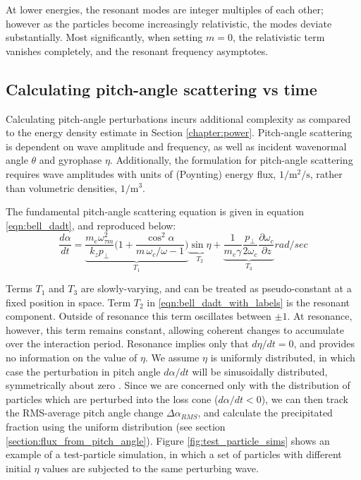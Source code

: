 At lower energies, the resonant modes are integer multiples of each other; however as the particles become increasingly relativistic, the modes deviate substantially. Most significantly, when setting $m=0$, the relativistic term vanishes completely, and the resonant frequency asymptotes.

\subsection{Calculating pitch-angle scattering vs time}

Calculating pitch-angle perturbations incurs additional complexity as compared to the energy density estimate in Section \ref{chapter:power}. Pitch-angle scattering is dependent on wave amplitude and frequency, as well as incident wavenormal angle $\theta$ and gyrophase $\eta$. Additionally, the formulation for pitch-angle scattering requires wave amplitudes with units of (Poynting) energy flux, $\mathrm{1/m^2/s}$, rather than volumetric densities, $\mathrm{1/m^3}$.

The fundamental pitch-angle scattering equation is given in equation \eqref{eqn:bell_dadt}, and reproduced below:
\begin{equation}
\frac{d\alpha}{dt} = \underbrace{\frac{m_e \omega_{\tau m}^2}{k_z p_\perp} \bigg( 1 + \frac{\cos^2\alpha}{m\,\omega_c / \omega - 1}\bigg)}_{T_1}\underbrace{\sin \eta}_{T_2} + \underbrace{\frac{1}{m_e \gamma}\frac{p_\perp}{2 \omega_c}\frac{\partial \omega_c}{\partial z}}_{T_3} \unit{rad/sec}
\label{eqn:bell_dadt_with_labels}
\end{equation}

Terms $T_1$ and $T_3$ are slowly-varying, and can be treated as pseudo-constant at a fixed position in space. Term $T_2$ in \eqref{eqn:bell_dadt_with_labels} is the resonant component. Outside of resonance this term oscillates between $\pm 1$. At resonance, however, this term remains constant, allowing coherent changes to accumulate over the interaction period. Resonance implies only that $d\eta/dt = 0$, and provides no information on the value of $\eta$. We assume $\eta$ is uniformly distributed, in which case the perturbation in pitch angle $d\alpha/dt$ will be sinusoidally distributed, symmetrically about zero \citep{Inan1977}. Since we are concerned only with the distribution of particles which are perturbed into the loss cone ($d\alpha/dt < 0$), we can then track the RMS-average pitch angle change $\Delta \alpha_{RMS}$, and calculate the precipitated fraction using the uniform distribution (see section \ref{section:flux_from_pitch_angle}).
Figure \ref{fig:test_particle_sims} shows an example of a test-particle simulation, in which a set of particles with different initial $\eta$ values are subjected to the same perturbing wave.

